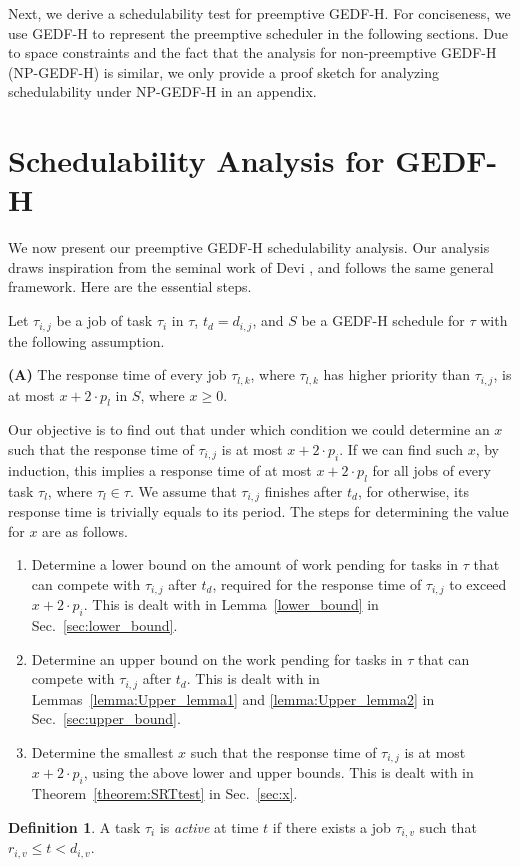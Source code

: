 \documentclass[Times, 10pt,twocolumn]{article}
\theoremstyle{definition}
\newtheorem{definition}{\textbf{Definition}}
\begin{document}
Next, we derive a schedulability test for preemptive GEDF-H. For conciseness, we use GEDF-H to represent the preemptive scheduler in the following sections. Due to space constraints and the fact that the analysis for non-preemptive GEDF-H (NP-GEDF-H) is similar, we only provide a proof sketch for analyzing schedulability under NP-GEDF-H in an appendix.

\section{Schedulability Analysis for GEDF-H}
\label{sec:EDF}

We now present our preemptive GEDF-H schedulability analysis. Our analysis draws inspiration from the seminal work of Devi \cite{Devi}, and follows the same general framework. Here are the essential steps.

Let $\tau_{i,j}$ be a job of task $\tau_i$ in $\tau$, $t_d = d_{i,j}$, and $S$ be a GEDF-H schedule for $\tau$ with the following assumption.

\vspace{1.5mm}
\textbf{(A)} The response time of every job $\tau_{l,k}$, where $\tau_{l,k}$ has higher priority than $\tau_{i,j}$, is at most $x+2 \cdot  p_l$ in $S$, where $x \geq 0$.
\vspace{1.5mm}

Our objective is to find out that under which condition we could determine an $x$ such that the response time of $\tau_{i,j}$ is at most $x+2 \cdot p_i$. If we can find such $x$, by induction, this implies a response time of at most $x +2 \cdot p_l$ for all jobs of every task $\tau_l$, where $\tau_l \in \tau$. We assume that $\tau_{i,j}$ finishes after $t_d$, for otherwise, its response time is trivially equals to its period. The steps for determining the value for $x$ are as follows.
\vspace{-1.5mm}
\begin{enumerate}
\item
Determine a lower bound on the amount of work pending for tasks in $\tau$ that can compete with $\tau_{i,j}$ after $t_d$, required for the response time of $\tau_{i,j}$ to exceed $x+2 \cdot p_i$. This is dealt with in Lemma~\ref{lower_bound} in Sec.~\ref{sec:lower_bound}.
\item \vspace{-1.5mm}
Determine an upper bound on the work pending for tasks in $\tau$ that can compete with $\tau_{i,j}$ after $t_d$. This is dealt with in Lemmas~\ref{lemma:Upper_lemma1} and \ref{lemma:Upper_lemma2} in Sec.~\ref{sec:upper_bound}.
\item \vspace{-1.5mm}
Determine the smallest $x$ such that the response time of $\tau_{i,j}$ is at most $x+2 \cdot p_i$, using the above lower and upper bounds. This is dealt with in Theorem~\ref{theorem:SRTtest} in Sec.~\ref{sec:x}.
\end{enumerate} 
\vspace{-2.5mm}
\begin{definition}
\label{def:active}
A task $\tau_i$ is \textit{active} at time $t$ if there exists a job $\tau_{i,v}$ such that $r_{i,v} \leq t < d_{i,v}$.
\end{definition}
\end{document}
